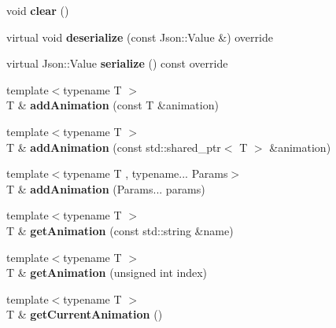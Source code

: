 \begin{DoxyCompactItemize}
void {\bfseries clear} ()
\item 
\mbox{\label{classbkengine_1_1Element_a84c3ed3c1f65adcff1febfcaccb6dfbc}} 
virtual void {\bfseries deserialize} (const Json\+::\+Value \&) override
\item 
\mbox{\label{classbkengine_1_1Element_a8c82eb831b009ca1c25637402c1d6c42}} 
virtual Json\+::\+Value {\bfseries serialize} () const override
\item 
\mbox{\label{classbkengine_1_1Element_a6a35edffac23310366fe0013b6a22ae8}} 
{\footnotesize template$<$typename T $>$ }\\T \& {\bfseries add\+Animation} (const T \&animation)
\item 
\mbox{\label{classbkengine_1_1Element_a053bf20ca1e7914d5a51ed1fa84b1bf5}} 
{\footnotesize template$<$typename T $>$ }\\T \& {\bfseries add\+Animation} (const std\+::shared\+\_\+ptr$<$ T $>$ \&animation)
\item 
\mbox{\label{classbkengine_1_1Element_a2f51235601148d0fa26d434f1c75d6e9}} 
{\footnotesize template$<$typename T , typename... Params$>$ }\\T \& {\bfseries add\+Animation} (Params... params)
\item 
\mbox{\label{classbkengine_1_1Element_a405c00e434c1a27f79704b0ee58da4d4}} 
{\footnotesize template$<$typename T $>$ }\\T \& {\bfseries get\+Animation} (const std\+::string \&name)
\item 
\mbox{\label{classbkengine_1_1Element_ab0c456bd25eaaa697d7485a46b1db5f4}} 
{\footnotesize template$<$typename T $>$ }\\T \& {\bfseries get\+Animation} (unsigned int index)
\item 
\mbox{\label{classbkengine_1_1Element_acdf66af78486ded77d87edd4773b9157}} 
{\footnotesize template$<$typename T $>$ }\\T \& {\bfseries get\+Current\+Animation} ()
\end{DoxyCompactItemize}

